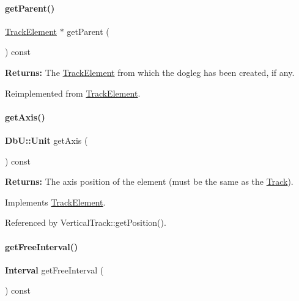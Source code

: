 \paragraph{\texorpdfstring{get\+Parent()}{getParent()}}
{\footnotesize\ttfamily \hyperlink{classKite_1_1TrackElement}{Track\+Element} $\ast$ get\+Parent (\begin{DoxyParamCaption}{ }\end{DoxyParamCaption}) const\hspace{0.3cm}{\ttfamily [virtual]}}

{\bfseries Returns\+:} The \hyperlink{classKite_1_1TrackElement}{Track\+Element} from which the dogleg has been created, if any. 

Reimplemented from \hyperlink{classKite_1_1TrackElement_a95ec3b8e7e1ec87c20ee0b37bcc96df7}{Track\+Element}.

\mbox{\label{classKite_1_1TrackSegment_ab5b5aaa5b318369feee6003dbad039c2}} 
\paragraph{\texorpdfstring{get\+Axis()}{getAxis()}}
{\footnotesize\ttfamily \textbf{ Db\+U\+::\+Unit} get\+Axis (\begin{DoxyParamCaption}{ }\end{DoxyParamCaption}) const\hspace{0.3cm}{\ttfamily [virtual]}}

{\bfseries Returns\+:} The axis position of the element (must be the same as the \hyperlink{classKite_1_1Track}{Track}). 

Implements \hyperlink{classKite_1_1TrackElement_ac492fb5399691d81c31547db6b56fd03}{Track\+Element}.



Referenced by Vertical\+Track\+::get\+Position().

\mbox{\label{classKite_1_1TrackSegment_a034711e2d3617ea848ef9f5a18255e10}} 
\paragraph{\texorpdfstring{get\+Free\+Interval()}{getFreeInterval()}}
{\footnotesize\ttfamily \textbf{ Interval} get\+Free\+Interval (\begin{DoxyParamCaption}{ }\end{DoxyParamCaption}) const\hspace{0.3cm}{\ttfamily [virtual]}}


